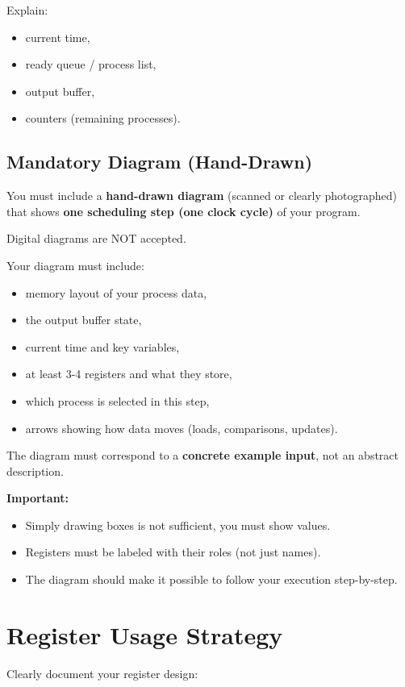 \documentclass[a4paper,12pt]{article}
\begin{document}
Explain:
\begin{itemize}
\item current time,
\item ready queue / process list,
\item output buffer,
\item counters (remaining processes).
\end{itemize}

\subsection{Mandatory Diagram (Hand-Drawn)}

You must include a \textbf{hand-drawn diagram} (scanned or clearly photographed) that shows \textbf{one scheduling step (one clock cycle)} of your program.

Digital diagrams are NOT accepted.

Your diagram must include:

\begin{itemize}
\item memory layout of your process data,
\item the output buffer state,
\item current time and key variables,
\item at least 3-4 registers and what they store,
\item which process is selected in this step,
\item arrows showing how data moves (loads, comparisons, updates).
\end{itemize}

The diagram must correspond to a \textbf{concrete example input}, not an abstract description.

\textbf{Important:}
\begin{itemize}
\item Simply drawing boxes is not sufficient, you must show values.
\item Registers must be labeled with their roles (not just names).
\item The diagram should make it possible to follow your execution step-by-step.
\end{itemize}

\section{Register Usage Strategy}

Clearly document your register design:
\end{document}
